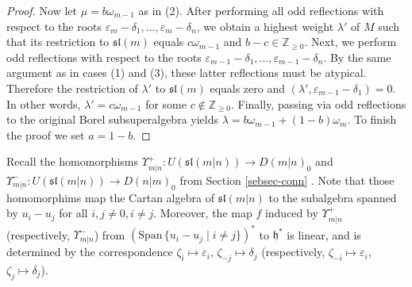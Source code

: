 \documentclass[12pt]{amsart}
\makeatletter
\def\@putname#1#2#3#4{\def\@@ref{#3}\let\old@bf\bf
        \def\bf##1{\old@bf\if?\noexpand##1?{#4}\else##1\fi}%
	#1{#2}%
        \let\bf\old@bf}
\def\@putname#1#2#3#4{\def\@@ref{#3}\let\old@bf\bf	%
	\let\old@reset@font\reset@font			%
        \def\bf##1{\old@bf\if?\noexpand##1?{#4}\else##1\fi}%
	\def\reset@font##1##2{\old@reset@font##1\if?\noexpand##2?{#4}\else##2\fi}#1{#2}%
        \let\bf\old@bf\let\reset@font\old@reset@font}
\let\my@ref=\ref
\def\ref#1{\@putname\my@ref{#1}{#1}{\tiny\rm\@@ref}}
\theoremstyle{plain} %
\numberwithin{equation}{section}
\theoremstyle{definition}
\theoremstyle{remark}
\theoremstyle{plain} %
\renewcommand{\sl}{\mathfrak{sl}}
\makeatother
\begin{document}
\begin{proof}
    Now let $\mu=b\omega_{m-1}$ as in (2). After performing all  odd reflections with respect to the
       roots $\varepsilon_m-\delta_1,\dots,\varepsilon_m-\delta_n$,
       we obtain a highest weight $\lambda'$ of $M$ such that its restriction to $\mathfrak{sl}(m)$ equals
       $c\omega_{m-1}$ and $b-c\in\mathbb Z_{\geq 0}$. Next, we perform odd reflections with respect to the roots
       $\varepsilon_{m-1}-\delta_1,\dots,\varepsilon_{m-1}-\delta_n$. By the same argument as in cases (1) and (3),  these latter reflections must be atypical.
       Therefore the restriction of
       $\lambda'$ to $\mathfrak{sl}(m)$ equals zero and $(\lambda',\varepsilon_{m-1}-\delta_1)=0$. In other words, $\lambda'=c\omega_{m-1}$ for some
       $c\notin \mathbb Z_{\geq 0}$. Finally,  passing via odd reflections to the original
       Borel subsuperalgebra yields $\lambda=b\omega_{m-1}+(1-b)\omega_{m}$. To finish the proof we set $a=1-b$.
        \end{proof}
   
  Recall the homomorphisms $\Upsilon^+_{m|n} : U(\sl (m|n))\to D(m|n)_{{0}}$ and $\Upsilon^-_{m|n} : U(\sl (m|n))\to D(n|m)_{{0}}$ from Section \ref{sebsec-conn}. Note that those homomorphims map the Cartan algebra of $\sl(m|n)$ to the subalgebra spanned by
        $u_i-u_j$ for all $i,j\neq 0, i\neq j$. 
          Moreover, the map $f$ induced by  $\Upsilon^+_{m|n} $  (respectively, $\Upsilon^-_{m|n}$) from 
          $\left(\mbox{Span}\, \{ u_i-u_j \; | \; i \neq j\}\right)^*$ to $\mathfrak h^*$ is linear, and is determined by the correspondence
             $\zeta_i \mapsto \varepsilon_i $, $\zeta_{-j} \mapsto \delta_j$
        (respectively, $\zeta_{-i} \mapsto \varepsilon_i$, $\zeta_{j} \mapsto \delta_j$).
       
        
       
\end{document}
